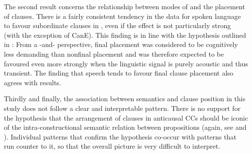 The second result concerns the relationship between modes of  and the placement of clauses. There is a fairly consistent tendency in the data for spoken language to favour subordinate clauses in , even if the effect is not particularly strong (with the exception of CanE). This finding is in line with the hypothesis outlined in : From a -and- perspective, final placement was considered to be cognitively less demanding than nonfinal placement and was therefore expected to be favoured even more strongly when the linguistic signal is purely acoustic and thus transient. The finding that speech tends to favour final clause placement also agrees with  results.

Thirdly and finally, the association between semantics and clause position in this study does not follow a clear and interpretable pattern. There is no support for the hypothesis that the arrangement of clauses in anticausal CCs should be iconic of the intra-constructional semantic relation between propositions (again, see  and ). Individual patterns that confirm the hypothesis co-occur with patterns that run counter to it, so that the overall picture is very difficult to interpret.

